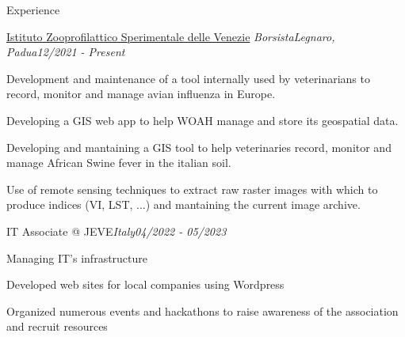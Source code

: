 \documentclass{article}
\newlength{\secsep}
\newcommand{\lineunder}{\vspace*{-8pt} \\ \hspace*{-6pt} \hrulefill \\ \vspace*{-8pt}}
\newenvironment{tabbedsection}[1]{
  \begin{list}{}{
      \setlength{\itemsep}{0pt}
      \setlength{\labelsep}{0pt}
      \setlength{\labelwidth}{0pt}
      \setlength{\leftmargin}{}
      \setlength{\rightmargin}{}
      \setlength{\listparindent}{0pt}
      \setlength{\parsep}{0pt}
      \setlength{\parskip}{0pt}
      \setlength{\partopsep}{0pt}
      \setlength{\topsep}{#1}
    }
  \item[]
}{\end{list}}
\newenvironment{resume_section}[1]{
  \filbreak
  \vspace{2\secsep}
  \textsc{\large#1}
  \lineunder
  \begin{tabbedsection}{0pt}
}{\end{tabbedsection}}
\newenvironment{subitems}{
  \renewcommand{\labelitemi}{•}
  \begin{itemize}
      \setlength{\labelsep}{1em}
}{\end{itemize}}
\newenvironment{resume_employer}[4]{
  \textbf{#1} \\ 
  \noindent \makebox[\linewidth][l]{{\small #2} \hfill {\footnotesize #3 (#4)}} \begin{tabbedsection}{0pt}
  \begin{subitems}
}{\end{subitems}\end{tabbedsection}}
\begin{document}
\begin{resume_section}{Experience}
    \begin{resume_employer}{\href{https://www.izsvenezie.it/}{Istituto Zooprofilattico Sperimentale delle Venezie} }{\textit{Borsista}}{\textit{Legnaro, Padua}}{\textit{12/2021 - Present}}
    \vspace{-\baselineskip}
    
\item Development and maintenance of a tool internally used by veterinarians to record, monitor and manage avian influenza in Europe.

\item Developing a GIS web app to help WOAH manage and store its geospatial data.

\item Developing and mantaining a GIS tool to help veterinaries record, monitor and manage African Swine fever in the italian soil.

\item Use of remote sensing techniques to extract raw raster images with which to produce indices (VI, LST, ...) and mantaining the current image archive.

\vspace{0.2cm}

\end{resume_employer}

\begin{resume_employer}{IT Associate @ JEVE}{\textit{}}{\textit{Italy}}{\textit{04/2022 - 05/2023}}
     \vspace{-\baselineskip}
    \item Managing IT's infrastructure
    \item Developed web sites for local companies using Wordpress
    \item Organized numerous events and hackathons to raise awareness of the association and recruit resources
  
 \vspace{0.2cm}
  
\end{resume_employer}
\end{resume_section}
\end{document}
